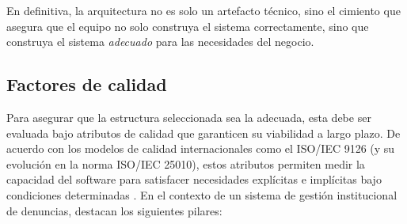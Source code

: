 En definitiva, la arquitectura no es solo un artefacto técnico, sino el cimiento que asegura que el equipo no solo construya el sistema correctamente, sino que construya el sistema \textit{adecuado} para las necesidades del negocio.

\subsection{Factores de calidad}

Para asegurar que la estructura seleccionada sea la adecuada, esta debe ser evaluada bajo atributos de calidad que garanticen su viabilidad a largo plazo. De acuerdo con los modelos de calidad internacionales como el ISO/IEC 9126 (y su evolución en la norma ISO/IEC 25010), estos atributos permiten medir la capacidad del software para satisfacer necesidades explícitas e implícitas bajo condiciones determinadas \cite{28} . En el contexto de un sistema de gestión institucional de denuncias, destacan los siguientes pilares:

